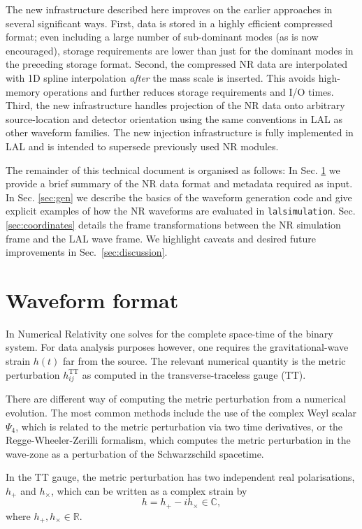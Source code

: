 \documentclass[11pt,tightenlines,article,amssymb,amsmath,amsfonts,superscriptaddress]{revtex4}
\begin{document}
The new infrastructure described here improves on the earlier approaches
in several significant ways. First, data is stored in a highly efficient compressed format;  even including a large number of sub-dominant modes (as is now encouraged), storage requirements are lower than just for the dominant modes in the preceding storage format.  
Second, the compressed NR data are interpolated with 1D spline interpolation \emph{after} the mass scale is inserted. This avoids high-memory operations and further reduces storage requirements and I/O times.  Third, the new infrastructure handles projection of the NR data onto
arbitrary source-location and detector orientation using the same conventions
in LAL as other waveform families.
The new injection infrastructure is fully implemented in LAL and is intended to supersede previously used NR modules.

The remainder of this technical document is organised as follows: In Sec. \ref{sec:format} we provide a brief summary
of the NR data format and metadata required as input. In Sec. \ref{sec:gen} we describe the basics of the waveform generation code and give explicit examples of how the NR waveforms are evaluated in \texttt{lalsimulation}. Sec. \ref{sec:coordinates} details the frame transformations between the NR simulation frame and the LAL wave frame. We highlight caveats and desired future improvements in Sec.~\ref{sec:discussion}.

\section{Waveform format}
\label{sec:format}
In Numerical Relativity one solves for the complete space-time of the binary system. For data analysis
purposes however, one requires the gravitational-wave strain $h(t)$ far from the source. The relevant numerical quantity
is the metric perturbation $h^\mathrm{TT}_{ij}$ as computed in the transverse-traceless gauge (TT). 

There are different way of computing the metric perturbation from a numerical evolution. The most common methods include
the use of the complex Weyl scalar $\Psi_4$, which is related to the metric perturbation via two time derivatives, or the
Regge-Wheeler-Zerilli formalism, which computes the metric perturbation in the wave-zone as a perturbation of the Schwarzschild
spacetime. 

In the TT gauge, the metric perturbation
has two independent real polarisations, $h_+$ and $h_\times$, which can be written as a complex strain by
\begin{equation}
\label{ }
h = h_+ - i h_\times \in \mathbb{C},
\end{equation}
where $h_+, h_\times \in \mathbb{R}$. \\
\end{document}
